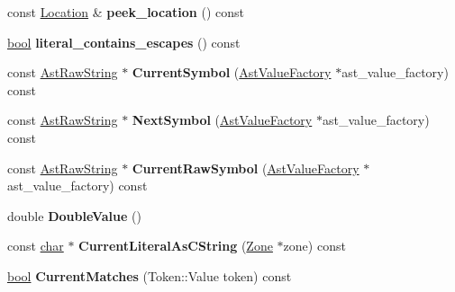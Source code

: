 \begin{DoxyCompactItemize}
const \mbox{\hyperlink{structv8_1_1internal_1_1Scanner_1_1Location}{Location}} \& {\bfseries peek\+\_\+location} () const
\item 
\mbox{\label{classv8_1_1internal_1_1Scanner_a493a8af2963c765abce032731c17e1c0}} 
\mbox{\hyperlink{classbool}{bool}} {\bfseries literal\+\_\+contains\+\_\+escapes} () const
\item 
\mbox{\label{classv8_1_1internal_1_1Scanner_a4902299eea1e00c7e20261d39203ccdb}} 
const \mbox{\hyperlink{classv8_1_1internal_1_1AstRawString}{Ast\+Raw\+String}} $\ast$ {\bfseries Current\+Symbol} (\mbox{\hyperlink{classv8_1_1internal_1_1AstValueFactory}{Ast\+Value\+Factory}} $\ast$ast\+\_\+value\+\_\+factory) const
\item 
\mbox{\label{classv8_1_1internal_1_1Scanner_abde47d9a0bbc660fd4508519185a8e0f}} 
const \mbox{\hyperlink{classv8_1_1internal_1_1AstRawString}{Ast\+Raw\+String}} $\ast$ {\bfseries Next\+Symbol} (\mbox{\hyperlink{classv8_1_1internal_1_1AstValueFactory}{Ast\+Value\+Factory}} $\ast$ast\+\_\+value\+\_\+factory) const
\item 
\mbox{\label{classv8_1_1internal_1_1Scanner_a6ef88cefb48d73880e57964751c4aac8}} 
const \mbox{\hyperlink{classv8_1_1internal_1_1AstRawString}{Ast\+Raw\+String}} $\ast$ {\bfseries Current\+Raw\+Symbol} (\mbox{\hyperlink{classv8_1_1internal_1_1AstValueFactory}{Ast\+Value\+Factory}} $\ast$ast\+\_\+value\+\_\+factory) const
\item 
\mbox{\label{classv8_1_1internal_1_1Scanner_a86409d59b79b3685549d19b810471f92}} 
double {\bfseries Double\+Value} ()
\item 
\mbox{\label{classv8_1_1internal_1_1Scanner_a58658519737ee0c3477f0fb4be409e57}} 
const \mbox{\hyperlink{classchar}{char}} $\ast$ {\bfseries Current\+Literal\+As\+C\+String} (\mbox{\hyperlink{classv8_1_1internal_1_1Zone}{Zone}} $\ast$zone) const
\item 
\mbox{\label{classv8_1_1internal_1_1Scanner_a56b75c63f353505cd9bc258a3c2f37ec}} 
\mbox{\hyperlink{classbool}{bool}} {\bfseries Current\+Matches} (Token\+::\+Value token) const

\end{DoxyCompactItemize}

